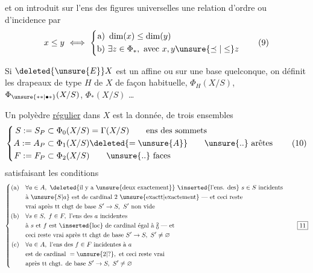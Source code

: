 et on introduit sur l'ens  des figures universelles une relation d'ordre ou d'incidence par
\[
 x\leq y\ \Longleftrightarrow\
 \left\{\begin{aligned}
 \text{a)}\ &\dim(x)\leq\dim(y)\\
 \text{b)}\ &\exists z\in\Phi_*,\ \text{avec }x,y\unsure{\preceq|\leq}z
 \end{aligned}\right.\tag*{(9)}
\]

Si $\deleted{\unsure{E}}X$ est un   affine ou    sur une base quelconque, on définit les drapeaux de type $H$  de $X$ de façon habituelle,  $\Phi_H(X/S)$, $\Phi_{\unsure{**|\bullet *}}(X/S)$, $\Phi_*(X/S)$ \ldots
\margin{\unsure{Quasi simplt|ou simplt}}

Un polyèdre \uline{régulier}   dans $X$ est la donnée,  de trois ensembles 
\[
 \left\{\begin{aligned}
 S:=S_P&\subset\Phi_0(X/S)=\Gamma(X/S)\qquad\text{ens des sommets}\\
 A:=A_P&\subset\Phi_1(X/S)\deleted{=\unsure{A}}\qquad\text{\unsure{..} arêtes}\\
 F:=F_P&\subset\Phi_2(X/S)\qquad\text{\unsure{..} faces}
 \end{aligned}\right.\tag*{(10)}
\]
satisfaisant les conditions
\[
 \left\{\begin{aligned}
 \text{(a)}\quad &\forall a\in A,\ \text{\deleted{il y a \unsure{deux exactement}} \inserted{l'ens. des}}\ s\in S\ \text{incidents}\\
 &\text{à }\unsure{S|a}\text{ est de cardinal 2 \unsure{exactt|exactement} --- et ceci reste}\\
 &\text{vrai après }\text{tt chgt de base }S'\to S,\ S'\text{ non vide}\\
 \text{(b)}\quad &\forall s\in S,\ f\in F,\ \text{l'ens des }a\text{ incidentes}\\
 &\text{à }s\text{ et }f\text{ est \inserted{loc} de cardinal égal à }\substack{2\\0}\text{ --- et}\\
 &\text{ceci reste vrai après }\text{tt chgt de base }S'\to S,\ S'\ne\varnothing\\
 \text{(c)}\quad &\forall a\in A,\ \text{l'ens des }f\in F\text{ incidentes à }a\\
 &\text{est de cardinal }=\unsure{2|?},\ \text{et ceci reste vrai}\\
 &\text{après }\text{tt chgt. de base }S'\to S,\ S'\ne\varnothing
 \end{aligned}\right.\tag*{\boxed{11}}
\]
